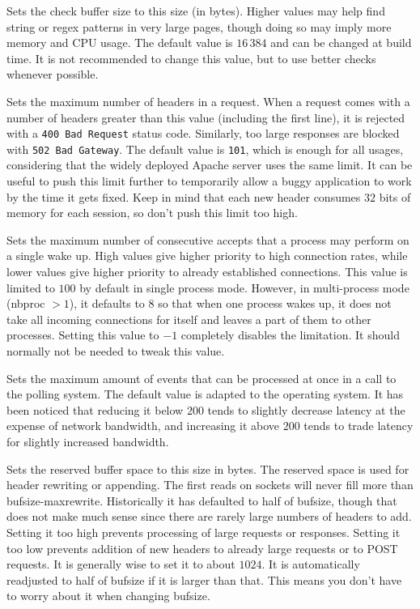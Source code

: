 \begin{keywords}
 

  Sets the check buffer size to this size (in bytes). Higher values may help
  find string or regex patterns in very large pages, though doing so may imply
  more memory and CPU usage. The default value is $16\,384$ and can be changed at
  build time. It is not recommended to change this value, but to use better
  checks whenever possible.

 

  Sets the maximum number of headers in a request. When a request comes with a
  number of headers greater than this value (including the first line), it is
  rejected with a \verb"400 Bad Request" status code. Similarly, too large responses
  are blocked with \verb"502 Bad Gateway". The default value is \verb|101|,
  which is enough for all usages, considering that the widely deployed Apache
  server uses the same limit. It can be useful to push this limit further
  to temporarily allow a buggy application to work by the time it gets fixed.
  Keep in mind that each new header consumes $32$ bits of memory for each session,
  so don't push this limit too high.

 

  Sets the maximum number of consecutive accepts that a process may perform on
  a single wake up. High values give higher priority to high connection rates,
  while lower values give higher priority to already established connections.
  This value is limited to $100$ by default in single process mode. However, in
  multi-process mode (nbproc $> 1$), it defaults to $8$ so that when one process
  wakes up, it does not take all incoming connections for itself and leaves a
  part of them to other processes. Setting this value to $-1$ completely disables
  the limitation. It should normally not be needed to tweak this value.

 

  Sets the maximum amount of events that can be processed at once in a call to
  the polling system. The default value is adapted to the operating system. It
  has been noticed that reducing it below $200$ tends to slightly decrease
  latency at the expense of network bandwidth, and increasing it above $200$
  tends to trade latency for slightly increased bandwidth.

 

  Sets the reserved buffer space to this size in bytes. The reserved space is
  used for header rewriting or appending. The first reads on sockets will never
  fill more than bufsize-maxrewrite. Historically it has defaulted to half of
  bufsize, though that does not make much sense since there are rarely large
  numbers of headers to add. Setting it too high prevents processing of large
  requests or responses. Setting it too low prevents addition of new headers
  to already large requests or to POST requests. It is generally wise to set it
  to about $1024$. It is automatically readjusted to half of bufsize if it is
  larger than that. This means you don't have to worry about it when changing
  bufsize.


\end{keywords}
